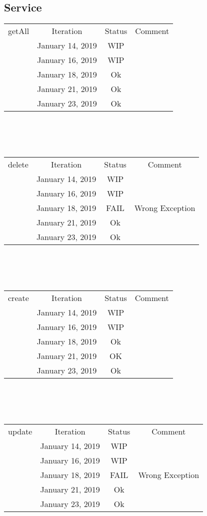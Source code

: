 \documentclass{scrreprt}
\begin{document}
\subsection{Service}
	\begin{tabularx}{12cm}{X|c|c|c}
		getAll & Iteration & Status & Comment  \\
		& January 14, 2019 & WIP & \\
		& January 16, 2019 & WIP & \\
		& January 18, 2019 & Ok & \\
		& January 21, 2019 & Ok & \\
		& January 23, 2019 & Ok & \\
	\end{tabularx}	
	\\ \\ \\
	\begin{tabularx}{12cm}{X|c|c|c}
		delete & Iteration & Status & Comment  \\
		& January 14, 2019 & WIP & \\
		& January 16, 2019 & WIP & \\
		& January 18, 2019 & FAIL & Wrong Exception \\
		& January 21, 2019 & Ok & \\
		& January 23, 2019 & Ok & \\
	\end{tabularx}	
	\\ \\ \\
	\begin{tabularx}{12cm}{X|c|c|c}
		create & Iteration & Status & Comment  \\
		& January 14, 2019 & WIP & \\
		& January 16, 2019 & WIP & \\
		& January 18, 2019 & Ok & \\
		& January 21, 2019 & OK & \\ 
		& January 23, 2019 & Ok & \\
	\end{tabularx}	
	\\ \\ \\
	\begin{tabularx}{12cm}{X|c|c|c}
		update & Iteration & Status & Comment  \\
		& January 14, 2019 & WIP & \\
		& January 16, 2019 & WIP & \\
		& January 18, 2019 & FAIL & Wrong Exception \\
		& January 21, 2019 & Ok & \\
		& January 23, 2019 & Ok & \\
	\end{tabularx}	
\\
\end{document}
